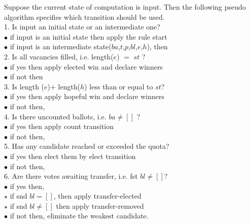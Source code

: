 \documentclass{llncs}
\begin{document}
\begin{definition}\label{stv:alg}
Suppose the current state of computation is \textsf{input}. Then the following pseudo algorithm specifies which transition should be used.\\
1. Is \textsf{input} an initial state or an intermediate one? \\
\hspace*{0.5cm}$\bullet$ if \textsf{input} is an initial state  then apply the rule start \\
\hspace*{0.5cm}$\bullet$ if \textsf{input} is an intermediate \textsf{state}($ba$,$t$,$p$,$bl$,$e$,$h$), then \\
\hspace*{0.6cm} 2. Is all vacancies filled, i.e. \textsf{length}($e$) $=$ $st$ ?\\
\hspace*{0.8cm}
$\bullet$ if yes then apply elected win and declare winners
\\\hspace*{0.8cm}
$\bullet$ if not then \\
\hspace*{0.95cm} 3. Is \textsf{length} ($e$)$+$ \textsf{length}($h$) less than or equal to $st$?\\ 
\hspace*{1.1cm}
$\bullet$ if yes then apply hopeful win and declare winners  
\\\hspace*{1.1cm} $\bullet$ if not then,\\
\hspace*{1.3cm} 4. Is there uncounted ballots, i.e. $ba\neq []$ ?\\
\hspace*{1.5cm} $\bullet$ if yes then apply count transition\\
\hspace*{1.5cm} $\bullet$ if not then,\\
\hspace*{1.7cm} 5. Has any candidate reached or exceeded the quota?\\
\hspace*{1.9cm} $\bullet$ if yes then elect them by elect transition\\
\hspace*{1.9cm} $\bullet$ if not then,\\
\hspace*{2.1cm} 6. Are there votes awaiting transfer, i.e. \textsf{fst} $bl\neq []$?\\
\hspace*{2.3cm} $\bullet$ if yes then,\\
 \hspace*{2.5cm}$\star$ if \textsf{snd} $bl=[]$, then apply transfer-elected\\
 \hspace*{2.5cm}$\star$ if \textsf{snd} $bl\neq []$ then apply transfer-removed\\
\hspace*{2.3cm} $\bullet$ if not then, eliminate the weakest candidate.\\

\end{definition}
\end{document}
